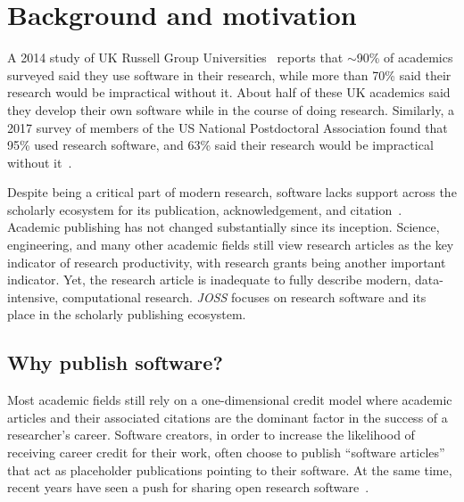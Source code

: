 \documentclass{article}
\newcommand\joss{\textit{JOSS}}
\begin{document}
\section{Background and motivation}\label{background}



A 2014 study of UK Russell Group Universities~\cite{Hettrick} reports that $\sim$90\% of academics surveyed said they use software in their research, while more than 70\% said their research would be impractical without it.
About half of these UK academics said they develop their own software while in the course of doing research.
Similarly, a 2017 survey of members of the US National Postdoctoral Association found that 95\% used research software, and 63\% said their research would be impractical without it~\cite{US-PDA-survey}.

Despite being a critical part of modern research, software lacks support across the scholarly ecosystem for its publication, acknowledgement, and citation~\cite{Niemeyer:2016sc}.
Academic publishing has not changed substantially since its inception.
Science, engineering, and many other academic fields still view research articles as the key indicator of research productivity, with research grants being another important indicator.
Yet, the research article is inadequate to fully describe modern, data-intensive, computational research.
\joss{} focuses on research software and its place in the scholarly publishing ecosystem.

\subsection{Why publish software?}

Most academic fields still rely on a one-dimensional credit model where academic articles and their associated citations are the dominant factor in the success of a researcher's career. Software creators, in order to increase the likelihood of receiving career credit for their work, often choose to publish ``software articles'' that act as placeholder publications pointing to their software.
At the same time, recent years have seen a push for sharing open research software~\cite{Barnes:2010ut,Vandewalle:2012cl,Morin:2012hz,Ince:2012iy,NatureMethodsEditorialBoard:2014gu,Prins:natbio}.
\end{document}
